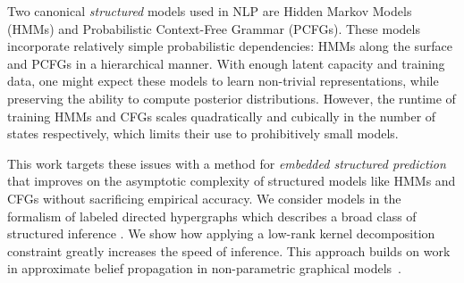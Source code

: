 \documentclass{article}
\newcommand\todo[1]{\textcolor{red}{#1}}
\begin{document}
Two canonical \textit{structured} models used in NLP are Hidden Markov
Models (HMMs) and Probabilistic Context-Free Grammar (PCFGs). These models
incorporate relatively simple probabilistic dependencies: HMMs along
the surface and PCFGs in a hierarchical manner.  With enough latent
capacity and training data, one might expect these models to learn non-trivial
representations, while preserving the ability to compute posterior
distributions. However, the runtime of training HMMs and CFGs scales 
quadratically and cubically in the number of states respectively,
which limits their use to prohibitively small models.









This work targets these issues with a method for
\textit{embedded structured prediction} that improves on the asymptotic complexity
of structured models like HMMs and CFGs
without sacrificing empirical accuracy.
We consider models in the
formalism of labeled directed hypergraphs which describes a broad class
of structured inference \citep{klein2004parsing,huang2005better,zhou2006learning,javidian2020hypergraph,chiang2020factor}.
We show how applying a low-rank kernel
decomposition constraint greatly increases the speed of inference.
This approach builds on work in approximate belief propagation in non-parametric
graphical models~\citep{song2011kernelbp}.
\end{document}
